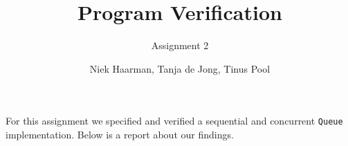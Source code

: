 \documentclass{scrartcl}
\title{Program Verification}
\subtitle{Assignment 2}
\author{Niek Haarman, Tanja de Jong, Tinus Pool}
\begin{document}
	
	\maketitle

For this assignment we specified and verified a sequential and concurrent \texttt{Queue} implementation. Below is a report about our findings.
	
	
\end{document}

